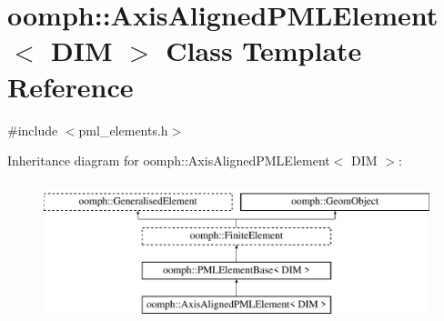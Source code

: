 \hypertarget{classoomph_1_1AxisAlignedPMLElement}{}\section{oomph\+:\+:Axis\+Aligned\+P\+M\+L\+Element$<$ D\+IM $>$ Class Template Reference}
\label{classoomph_1_1AxisAlignedPMLElement}


{\ttfamily \#include $<$pml\+\_\+elements.\+h$>$}

Inheritance diagram for oomph\+:\+:Axis\+Aligned\+P\+M\+L\+Element$<$ D\+IM $>$\+:\begin{figure}[H]
\begin{center}
\leavevmode
\includegraphics[height=4.000000cm]{classoomph_1_1AxisAlignedPMLElement}
\end{center}
\end{figure}
